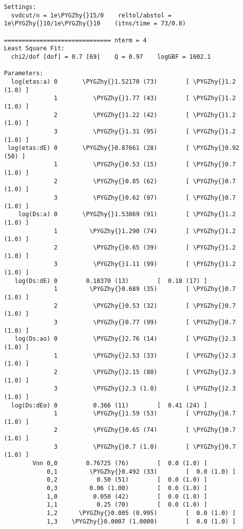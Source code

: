 \documentclass[letterpaper,10pt,english]{sphinxmanual}
\def\PYGZhy{\char`\-}
\begin{document}
\begin{Verbatim}[commandchars=\\\{\}]
Settings:
  svdcut/n = 1e\PYGZhy{}15/0    reltol/abstol = 1e\PYGZhy{}10/1e\PYGZhy{}10    (itns/time = 73/0.8)

============================== nterm = 4
Least Square Fit:
  chi2/dof [dof] = 0.7 [69]    Q = 0.97    logGBF = 1602.1

Parameters:
  log(etas:a) 0       \PYGZhy{}1.52170 (73)        [ \PYGZhy{}1.2 (1.0) ]  
              1          \PYGZhy{}1.77 (43)        [ \PYGZhy{}1.2 (1.0) ]  
              2          \PYGZhy{}1.22 (42)        [ \PYGZhy{}1.2 (1.0) ]  
              3          \PYGZhy{}1.31 (95)        [ \PYGZhy{}1.2 (1.0) ]  
 log(etas:dE) 0       \PYGZhy{}0.87661 (28)        [ \PYGZhy{}0.92 (50) ]  
              1          \PYGZhy{}0.53 (15)        [ \PYGZhy{}0.7 (1.0) ]  
              2          \PYGZhy{}0.85 (62)        [ \PYGZhy{}0.7 (1.0) ]  
              3          \PYGZhy{}0.62 (97)        [ \PYGZhy{}0.7 (1.0) ]  
    log(Ds:a) 0       \PYGZhy{}1.53869 (91)        [ \PYGZhy{}1.2 (1.0) ]  
              1         \PYGZhy{}1.290 (74)        [ \PYGZhy{}1.2 (1.0) ]  
              2          \PYGZhy{}0.65 (39)        [ \PYGZhy{}1.2 (1.0) ]  
              3          \PYGZhy{}1.11 (99)        [ \PYGZhy{}1.2 (1.0) ]  
   log(Ds:dE) 0        0.18370 (13)        [  0.18 (17) ]  
              1         \PYGZhy{}0.689 (35)        [ \PYGZhy{}0.7 (1.0) ]  
              2          \PYGZhy{}0.53 (32)        [ \PYGZhy{}0.7 (1.0) ]  
              3          \PYGZhy{}0.77 (99)        [ \PYGZhy{}0.7 (1.0) ]  
   log(Ds:ao) 0          \PYGZhy{}2.76 (14)        [ \PYGZhy{}2.3 (1.0) ]  
              1          \PYGZhy{}2.53 (33)        [ \PYGZhy{}2.3 (1.0) ]  
              2          \PYGZhy{}2.15 (80)        [ \PYGZhy{}2.3 (1.0) ]  
              3          \PYGZhy{}2.3 (1.0)        [ \PYGZhy{}2.3 (1.0) ]  
  log(Ds:dEo) 0          0.366 (11)        [  0.41 (24) ]  
              1          \PYGZhy{}1.59 (53)        [ \PYGZhy{}0.7 (1.0) ]  
              2          \PYGZhy{}0.65 (74)        [ \PYGZhy{}0.7 (1.0) ]  
              3          \PYGZhy{}0.7 (1.0)        [ \PYGZhy{}0.7 (1.0) ]  
        Vnn 0,0        0.76725 (76)        [  0.0 (1.0) ]  
            0,1         \PYGZhy{}0.492 (33)        [  0.0 (1.0) ]  
            0,2           0.50 (51)        [  0.0 (1.0) ]  
            0,3         0.06 (1.00)        [  0.0 (1.0) ]  
            1,0          0.050 (42)        [  0.0 (1.0) ]  
            1,1           0.25 (70)        [  0.0 (1.0) ]  
            1,2      \PYGZhy{}0.005 (0.995)        [  0.0 (1.0) ]  
            1,3    \PYGZhy{}0.0007 (1.0000)        [  0.0 (1.0) ]  

\end{Verbatim}
\end{document}
